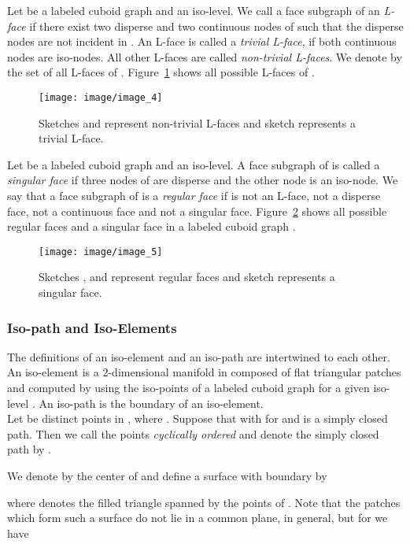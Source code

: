 \documentclass[a4paper,11pt]{article}
\begin{document}
Let  be a labeled cuboid graph and
 an iso-level. We call a face subgraph  of 
an {\it L-face} if there exist two disperse and two continuous nodes of  such that
the disperse nodes are not incident in . An L-face 
is called a {\it trivial L-face}, if both continuous nodes are iso-nodes. All other L-faces are called
{\it non-trivial L-faces}. We denote by  the set of all L-faces of . Figure~\ref{image_4} shows
all possible L-faces of .
\begin{figure}[!ht]
\texttt{[image: image/image\_4]}
\caption{Sketches  and  represent non-trivial L-faces and sketch  represents a trivial L-face.}
\label{image_4}
\end{figure}
\FloatBarrier

Let  be a labeled cuboid graph and
 an iso-level. A face subgraph  of
 is called a {\it singular face} if three nodes of  are disperse and the other node is
an iso-node. We say that a face subgraph  of  is a
{\it regular face} if   is not an L-face, not a disperse face, not a continuous face and not a
singular face. Figure~\ref{image_5} shows all possible regular faces and a singular face in
a labeled cuboid graph .
\begin{figure}[!ht]
\texttt{[image: image/image\_5]}
\caption{Sketches ,  and  represent regular faces and sketch  represents a singular face.}
\label{image_5}
\end{figure}
\FloatBarrier

\subsubsection{Iso-path and Iso-Elements}
The definitions of an iso-element and an iso-path are intertwined to each other. An iso-element is
a 2-dimensional manifold in  composed of flat triangular patches and computed
by using the iso-points of a labeled cuboid graph for a given iso-level . An iso-path is
the boundary of an iso-element.\\

Let  be distinct points in , where
. Suppose that  with  for  and
 is a simply closed path. Then we call the points
 {\it cyclically ordered} and denote the simply closed path  by .

We denote by  the center of  and define a surface with
boundary  by

where  denotes the filled triangle spanned by the points  of
. Note that the patches
which form such a surface do not lie in a common plane, in general, but for  we have
\end{document}
